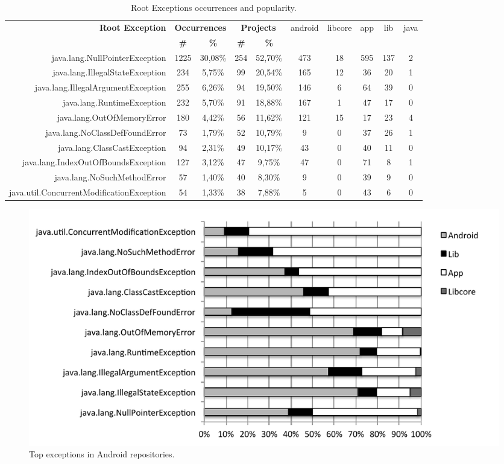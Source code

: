 \documentclass[conference]{IEEEtran}
\begin{document}
\begin{table}
  \centering
  \begin{tabular}{rccccccccc}
    \hline
    \bfseries{Root Exception} &  \multicolumn{2}{c}{\bfseries{Occurrences}} &  \multicolumn{2}{c}{\bfseries{Projects}} & \textsf{android} & \textsf{libcore} & \textsf{app} & \textsf{lib} & \textsf{java} \\
    & \bfseries{\#} &  \bfseries{\%} & \bfseries{\# } & \bfseries{\% } &&&&&\\
    \hline
java.lang.NullPointerException            & 1225 & 30,08\% & 254 & 52,70\% & 473 & 18 & 595 & 137 & 2 \\
java.lang.IllegalStateException           & 234  & 5,75\%  & 99  & 20,54\% & 165 & 12 & 36  & 20  & 1 \\
java.lang.IllegalArgumentException        & 255  & 6,26\%  & 94  & 19,50\% & 146 & 6  & 64  & 39  & 0 \\
java.lang.RuntimeException                & 232  & 5,70\%  & 91  & 18,88\% & 167 & 1  & 47  & 17  & 0 \\
java.lang.OutOfMemoryError                & 180  & 4,42\%  & 56  & 11,62\% & 121 & 15 & 17  & 23  & 4 \\
java.lang.NoClassDefFoundError            & 73   & 1,79\%  & 52  & 10,79\% & 9   & 0  & 37  & 26  & 1 \\
java.lang.ClassCastException              & 94   & 2,31\%  & 49  & 10,17\% & 43  & 0  & 40  & 11  & 0 \\
java.lang.IndexOutOfBoundsException       & 127  & 3,12\%  & 47  & 9,75\%  & 47  & 0  & 71  & 8   & 1 \\
java.lang.NoSuchMethodError               & 57   & 1,40\%  & 40  & 8,30\%  & 9   & 0  & 39  & 9   & 0 \\
java.util.ConcurrentModificationException & 54   & 1,33\%  & 38  & 7,88\%  & 5   & 0  & 43  & 6   & 0 \\

    \hline
  \end{tabular}
\caption{Root Exceptions occurrences and popularity.}
\label{tab:toptenandroid}
\end{table}

\begin{figure}
\centering
\includegraphics[width=\hsize]{top_exceptios_android.pdf}
\caption{Top exceptions in Android repositories.}
\label{fig:androidsignaler}
\end{figure}
\end{document}
